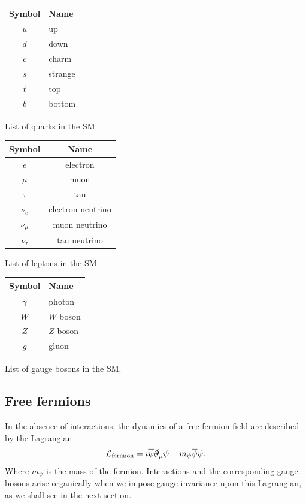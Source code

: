 \begin{margintable}[-15cm]
  \centering
  \begin{tabular}{c|l}
    Symbol & Name \\
  \hline
    $u$ & up\\
    $d$ & down \\
    $c$ & charm \\
    $s$ & strange \\
    $t$ & top \\
    $b$ & bottom \\
  \end{tabular}
  \caption{List of quarks in the SM.}
  \label{tab:quarks}
\end{margintable}

\begin{margintable}[-8cm]
  \centering
\begin{tabular}{c|c}
    Symbol & Name \\
  \hline
    $e$ & electron\\
    $\mu$ & muon \\
    $\tau$ & tau \\
    $\nu_e$ & electron neutrino \\
    $\nu_\mu$ & muon neutrino \\
    $\nu_\tau$ & tau neutrino \\
  \end{tabular}
  \caption{List of leptons in the SM.}
  \label{tab:leptons}
\end{margintable}

\begin{margintable}[-1cm]
  \centering
\begin{tabular}{c|l}
    Symbol & Name \\
  \hline
    $\gamma$ & photon\\
    $W$ & $W$ boson \\
    $Z$ & $Z$ boson \\
    $g$ & gluon \\
  \end{tabular}
  \caption{List of gauge bosons in the SM.}
  \label{tab:gaugebosons}
\end{margintable}

\subsection{Free fermions}
In the absence of interactions, the dynamics of a free fermion field \psi are described by the Lagrangian
\begin{align}
  \mathcal{L}_\text{fermion} = i\overline{\psi}\slashed{\partial}_\mu\psi-m_{\psi}\overline{\psi}\psi.
\label{eq:fermion_lagrangian}
\end{align}
Where $m_\psi$ is the mass of the fermion. Interactions and the corresponding gauge bosons arise organically when we impose gauge invariance upon this Lagrangian, as we shall see in the next section.

